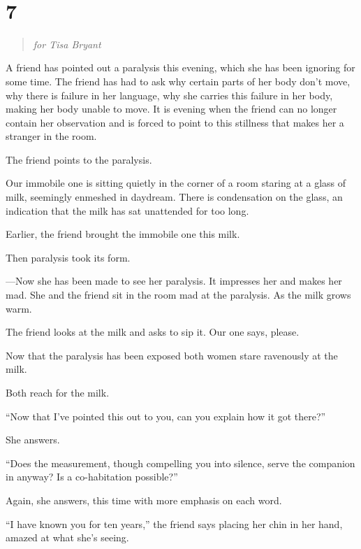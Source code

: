 \documentclass[
]{memoir}
\begin{document}
~

\hypertarget{section-15}{%
\section*{7}\label{section-15}}

\begin{verse}
\emph{for Tisa Bryant}\\
\end{verse}

A friend has pointed out a paralysis this evening, which she has been
ignoring for some time. The friend has had to ask why certain parts of
her body don't move, why there is failure in her language, why she
carries this failure in her body, making her body unable to move. It is
evening when the friend can no longer contain her observation and is
forced to point to this stillness that makes her a stranger in the room.

The friend points to the paralysis.

Our immobile one is sitting quietly in the corner of a room staring at a
glass of milk, seemingly enmeshed in daydream. There is condensation on
the glass, an indication that the milk has sat unattended for too long.

Earlier, the friend brought the immobile one this milk.

Then paralysis took its form.

---Now she has been made to see her paralysis. It impresses her and
makes her mad. She and the friend sit in the room mad at the paralysis.
As the milk grows warm.

The friend looks at the milk and asks to sip it. Our one says, please.

Now that the paralysis has been exposed both women stare ravenously at
the milk.

Both reach for the milk.

``Now that I've pointed this out to you, can you explain how it got
there?''

She answers.

``Does the measurement, though compelling you into silence, serve the
companion in anyway? Is a co-habitation possible?''

Again, she answers, this time with more emphasis on each word.

``I have known you for ten years,'' the friend says placing her chin in
her hand, amazed at what she's seeing.
\end{document}
